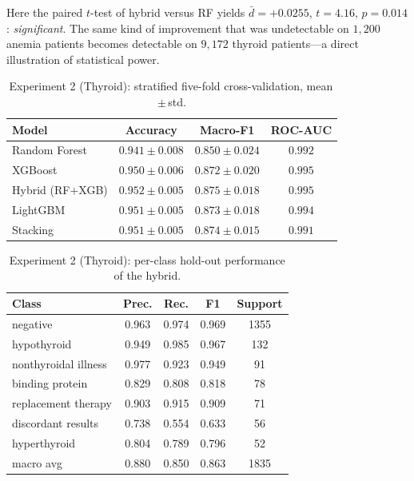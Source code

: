 \documentclass[conference]{IEEEtran}
\begin{document}
Here the paired $t$-test of hybrid versus RF yields $\bar{d}{=}{+}0.0255$,
$t{=}4.16$, $p{=}0.014$: \emph{significant}. The same kind of improvement that was
undetectable on $1{,}200$ anemia patients becomes detectable on $9{,}172$ thyroid
patients---a direct illustration of statistical power.

\begin{table}[t]
\caption{Experiment 2 (Thyroid): stratified five-fold cross-validation,
mean\,$\pm$\,std.}
\label{tab:thyroid_cv}
\centering
\renewcommand{\arraystretch}{1.2}
\begin{tabular}{lccc}
\toprule
\textbf{Model} & \textbf{Accuracy} & \textbf{Macro-F1} & \textbf{ROC-AUC} \\
\midrule
Random Forest        & $0.941\pm0.008$ & $0.850\pm0.024$ & $0.992$ \\
XGBoost              & $0.950\pm0.006$ & $0.872\pm0.020$ & $0.995$ \\
Hybrid (RF$+$XGB)    & $\mathbf{0.952\pm0.005}$ & $\mathbf{0.875\pm0.018}$ & $0.995$ \\
LightGBM             & $0.951\pm0.005$ & $0.873\pm0.018$ & $0.994$ \\
Stacking             & $0.951\pm0.005$ & $0.874\pm0.015$ & $0.991$ \\
\bottomrule
\end{tabular}
\end{table}

\begin{table}[t]
\caption{Experiment 2 (Thyroid): per-class hold-out performance of the hybrid.}
\label{tab:thyroid_pc}
\centering
\renewcommand{\arraystretch}{1.2}
\begin{tabular}{lcccc}
\toprule
\textbf{Class} & \textbf{Prec.} & \textbf{Rec.} & \textbf{F1} & \textbf{Support} \\
\midrule
negative              & 0.963 & 0.974 & 0.969 & 1355 \\
hypothyroid           & 0.949 & 0.985 & 0.967 & 132 \\
nonthyroidal illness  & 0.977 & 0.923 & 0.949 & 91 \\
binding protein       & 0.829 & 0.808 & 0.818 & 78 \\
replacement therapy   & 0.903 & 0.915 & 0.909 & 71 \\
discordant results    & 0.738 & 0.554 & 0.633 & 56 \\
hyperthyroid          & 0.804 & 0.789 & 0.796 & 52 \\
\midrule
macro avg             & 0.880 & 0.850 & 0.863 & 1835 \\
\bottomrule
\end{tabular}
\end{table}
\end{document}
